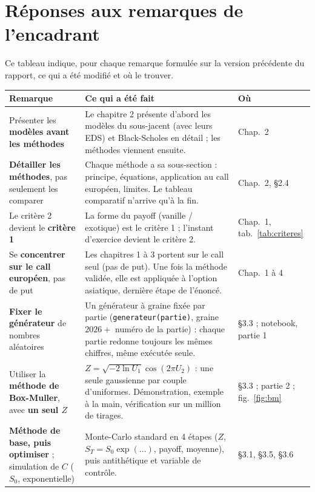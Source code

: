 \chapter{Réponses aux remarques de l'encadrant}

Ce tableau indique, pour chaque remarque formulée sur la version précédente du rapport, ce qui a été modifié et où le trouver.

\begin{table}[H]
\centering\small
\begin{tabularx}{\textwidth}{>{\raggedright\arraybackslash}p{4.6cm}L>{\raggedright\arraybackslash}p{2.6cm}}
\toprule
Remarque & Ce qui a été fait & Où \\
\midrule
Présenter les \textbf{modèles avant les méthodes} & Le chapitre 2 présente d'abord les modèles du sous-jacent (avec leurs EDS) et Black-Scholes en détail ; les méthodes viennent ensuite. & Chap.~2 \\
\addlinespace
\textbf{Détailler les méthodes}, pas seulement les comparer & Chaque méthode a sa sous-section : principe, équations, application au call européen, limites. Le tableau comparatif n'arrive qu'à la fin. & Chap.~2, §2.4 \\
\addlinespace
Le critère 2 devient le \textbf{critère 1} & La forme du payoff (vanille / exotique) est le critère 1 ; l'instant d'exercice devient le critère 2. & Chap.~1, tab.~\ref{tab:criteres} \\
\addlinespace
Se \textbf{concentrer sur le call européen}, pas de put & Les chapitres 1 à 3 portent sur le call seul (pas de put). Une fois la méthode validée, elle est appliquée à l'option asiatique, dernière étape de l'énoncé. & Chap.~1 à 4 \\
\addlinespace
\textbf{Fixer le générateur} de nombres aléatoires & Un générateur à graine fixée par partie (\texttt{generateur(partie)}, graine $2026 +$ numéro de la partie) : chaque partie redonne toujours les mêmes chiffres, même exécutée seule. & §3.3 ; notebook, partie 1 \\
\addlinespace
Utiliser la \textbf{méthode de Box-Muller}, avec \textbf{un seul $Z$} & $Z = \sqrt{-2\ln U_1}\cos(2\pi U_2)$ : une seule gaussienne par couple d'uniformes. Démonstration, exemple à la main, vérification sur un million de tirages. & §3.3 ; partie 2 ; fig.~\ref{fig:bm} \\
\addlinespace
\textbf{Méthode de base, puis optimiser} ; simulation de $C$ ($S_0$, exponentielle) & Monte-Carlo standard en 4 étapes ($Z$, $S_T = S_0\exp(\dots)$, payoff, moyenne), puis antithétique et variable de contrôle. & §3.1, §3.5, §3.6 \\

\end{tabularx}
\end{table}
